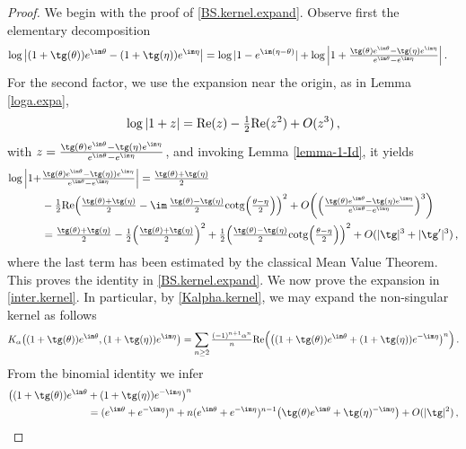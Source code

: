 \documentclass[a4paper,reqno,10pt]{article}
\begin{document}
\begin{proof}
   We begin with the proof of \eqref{BS.kernel.expand}. Observe first the elementary decomposition
    \begin{align*}
\log \big| (1+\tg(\theta))e^{\im\theta}  - (1+\tg(\eta))e^{\im\eta} \big|  &= \log| 1-e^{\im(\eta-\theta)} | +\log \Big|1+\tfrac{\tg(\theta)e^{\im\theta}  - \tg(\eta)e^{\im\eta}}{e^{\im\theta}-e^{\im\eta}} \Big|	\,.
    \end{align*}
    For the second factor, we use the expansion near the origin, as in Lemma \ref{loga.expa},
    $$
    \log|1+z|={\rm Re}(z)-\tfrac12{\rm Re}(z^2)+O(z^3)\,,$$
    with $z=\frac{\tg(\theta)e^{\im\theta}  - \tg(\eta)e^{\im\eta}}{e^{\im\theta}-e^{\im\eta}}$, and invoking Lemma \ref{lemma-1-Id}, it yields
   \begin{align*}
 \log \Big|1+&\tfrac{\tg(\theta)e^{\im\theta}  - \tg(\eta))e^{\im\eta}}{e^{\im\theta}-e^{\im\eta}} \Big| =\tfrac{\tg(\theta)+\tg(\eta)}{2} \\
 &-\tfrac12{\rm Re}\Big(\tfrac{\tg(\theta)+\tg(\eta)}{2} - \im\, \tfrac{\tg(\theta)-\tg(\eta)}{2} {\rm cotg}\Big(\tfrac{\theta-\eta}{2}\Big)\Big)^2+O\bigg(\Big(\tfrac{\tg(\theta)e^{\im\theta}  - \tg(\eta)e^{\im\eta}}{e^{\im\theta}-e^{\im\eta}}\Big)^3\bigg)\\
 &=\tfrac{\tg(\theta)+\tg(\eta)}{2}  -\tfrac12 \Big( \tfrac{\tg(\theta)+\tg(\eta)}{2} \Big)^2 +\tfrac12 \Big( \tfrac{\tg(\theta)-\tg(\eta)}{2} {\rm cotg} \Big(\tfrac{\theta-\eta}{2} \Big) \Big)^2+ O(|\tg|^3+|\tg^\prime|^3)\,,
    \end{align*} 
    where the last term has been estimated by the classical Mean Value Theorem.
    This proves the identity in \eqref{BS.kernel.expand}.
  We now prove the expansion in \eqref{inter.kernel}. In particular, by \eqref{Kalpha.kernel}, we may expand the non-singular kernel as follows
  \begin{equation}
  	\begin{aligned}
  		K_{\alpha}\big((1+\tg(\theta))e^{\im\theta},(1+\tg(\eta))e^{\im\eta}\big)  = \sum_{n\geq 2} \tfrac{(-1)^{n+1}\alpha^n}{n} {\rm Re} \Big( \big( (1+\tg(\theta))e^{\im\theta} + (1+\tg(\eta))e^{-\im\eta} \big)^n \Big) \,.
  	\end{aligned}
  \end{equation}
  From the binomial identity we infer
  \begin{equation}
  	\begin{aligned}
  		\big( (1+\tg(\theta))e^{\im\theta} & + (1+\tg(\eta))e^{-\im\eta} \big)^n \\ & = (e^{\im\theta}+e^{-\im\eta})^n +  n (e^{\im\theta}+e^{-\im\eta})^{n-1} \big( \tg(\theta)e^{\im\theta} +\tg(\eta)^{-\im\eta}  \big) + O(|\tg|^2)\,,

\end{aligned}
\end{equation}
\end{proof}
\end{document}
